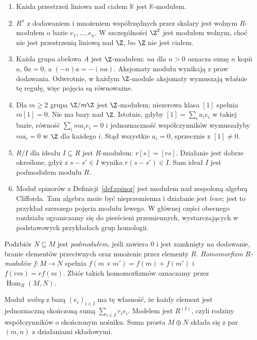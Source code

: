 \begin{przyklad}
\label{prz:moduly-podstawowe}
\begin{enumerate}[leftmargin=*]
\item Każda przestrzeń liniowa nad ciałem
      $\mathbb K$ jest $\mathbb K$-modułem.
\item $R^n$ z dodawaniem i mnożeniem współrzędnych
      przez skalary jest wolnym $R$-modułem o bazie
      $e_1,\ldots,e_n$. W szczególności $\Z^2$
      jest modułem wolnym, choć nie jest przestrzenią
      liniową nad $\Z$, bo $\Z$ nie jest ciałem.
\item Każda grupa abelowa $A$ jest $\Z$-modułem:
      $na$ dla $n>0$ oznacza sumę $n$ kopii $a$,
      $0a=0$, a $(-n)a=-(na)$. Aksjomaty modułu
      wynikają z praw dodawania. Odwrotnie,
      w każdym $\Z$-module aksjomaty wymuszają
      właśnie tę regułę, więc pojęcia są równoważne.
\item Dla $m\geq2$ grupa $\Z/m\Z$ jest $\Z$-modułem;
      niezerowa klasa $[1]$ spełnia $m[1]=0$. Nie ma bazy
      nad $\Z$. Istotnie, gdyby $[1]=\sum_i a_i e_i$ w takiej
      bazie, równość $\sum_i ma_i e_i=0$ i jednoznaczność
      współczynników wymuszałyby $ma_i=0$ w $\Z$ dla każdego $i$.
      Stąd wszystkie $a_i=0$, sprzecznie z $[1]\ne0$.
\item $R/I$ dla ideału $I\subseteq R$ jest
      $R$-modułem: $r[s]=[rs]$. Działanie jest
      dobrze określone, gdyż z $s-s'\in I$
      wynika $r(s-s')\in I$.
      Sam ideał $I$ jest podmodułem modułu $R$.
\item Moduł spinorów z Definicji~\ref{def:spinor}
      jest modułem nad zespoloną algebrą
      Clifforda. Tam algebra może być
      nieprzemienna i działanie jest \emph{lewe};
      jest to przykład szerszego pojęcia modułu lewego.
      W głównej części obecnego rozdziału ograniczamy się
      do pierścieni przemiennych, wystarczających
      w podstawowych przykładach grup homologii.
\end{enumerate}
\end{przyklad}

\begin{definicja}
\label{def:modul-map}
Podzbiór $N\subseteq M$ jest \emph{podmodułem}, jeśli zawiera $0$
i jest zamknięty na dodawanie, branie elementów przeciwnych
oraz mnożenie przez elementy $R$.
\emph{Homomorfizm $R$-modułów} $f:M\to N$ spełnia
$f(m+m')=f(m)+f(m')$ i $f(rm)=rf(m)$.
Zbiór takich homomorfizmów oznaczamy przez $\operatorname{Hom}_R(M,N)$.

Moduł \emph{wolny} z bazą $(e_i)_{i\in I}$ ma tę własność,
że każdy element jest jednoznaczną skończoną sumą
$\sum_{i\in I}r_i e_i$. Modelem jest $R^{(I)}$, czyli rodziny
współczynników o skończonym nośniku. Suma prosta $M\oplus N$
składa się z par $(m,n)$ z działaniami składowymi.
\end{definicja}


